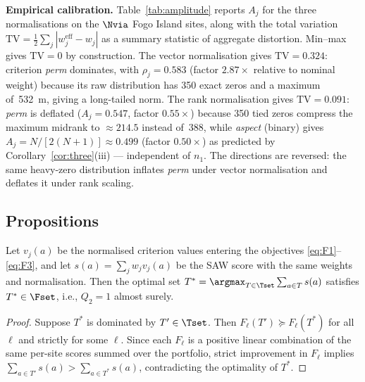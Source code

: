 \noindent\textbf{Empirical calibration.}
Table~\ref{tab:amplitude} reports $A_j$ for the three normalisations on
the $\Nvia$ Fogo Island sites, along with the total variation
$\mathrm{TV} = \frac{1}{2}\sum_j |w_j^{\mathrm{eff}} - w_j|$ as a
summary statistic of aggregate distortion.
Min--max gives $\mathrm{TV} = 0$ by construction.
The vector normalisation gives $\mathrm{TV} = 0.324$: criterion
\textit{perm} dominates, with $\rho_j = 0.583$ (factor
$\mathbf{2.87\times}$ relative to nominal weight) because its raw
distribution has 350 exact zeros and a maximum of~532~m, giving a
long-tailed norm.
The rank normalisation gives $\mathrm{TV} = 0.091$: \textit{perm} is
deflated ($A_j = 0.547$, factor $\mathbf{0.55\times}$) because 350
tied zeros compress the maximum midrank to $\approx 214.5$ instead
of~$388$, while \textit{aspect} (binary) gives $A_j = N/[2(N+1)]
\approx 0.499$ (factor $\mathbf{0.50\times}$) as predicted by
Corollary~\ref{cor:three}(iii) --- independent of $n_1$.
The directions are reversed: the same heavy-zero distribution inflates
\textit{perm} under vector normalisation and deflates it under rank
scaling.


\subsection{Propositions}
\label{sec:theorems}

\begin{proposition}
\label{prop:p1}
Let $v_j(a)$ be the normalised criterion values entering the objectives
\eqref{eq:F1}--\eqref{eq:F3}, and let $s(a) = \sum_j w_j v_j(a)$ be
the SAW score with the same weights and normalisation.
Then the optimal set
$T^* = \argmax_{T \in \Tset} \sum_{a \in T} s(a)$
satisfies $T^* \in \Fset$, i.e., $Q_2 = 1$ almost surely.
\end{proposition}

\begin{proof}
Suppose $T^*$ is dominated by $T' \in \Tset$.
Then $F_\ell(T') \succeq F_\ell(T^*)$ for all $\ell$ and strictly for
some $\ell$.
Since each $F_\ell$ is a positive linear combination of the same
per-site scores summed over the portfolio, strict improvement in
$F_\ell$ implies $\sum_{a \in T'} s(a) > \sum_{a \in T^*} s(a)$,
contradicting the optimality of $T^*$.
\end{proof}

